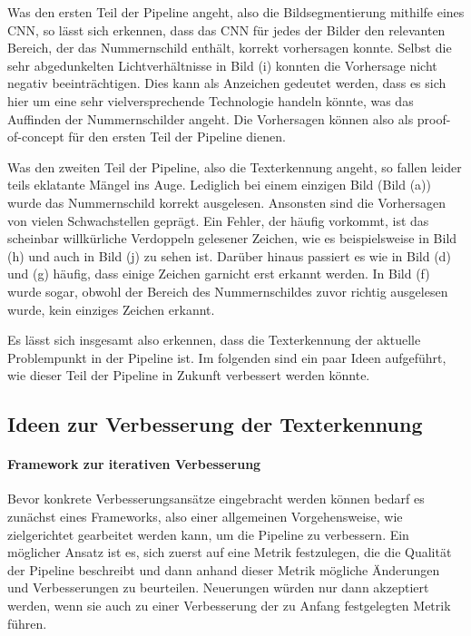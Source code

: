 Was den ersten Teil der Pipeline angeht, also die Bildsegmentierung
mithilfe eines CNN, so l\"asst sich erkennen, dass das CNN f\"ur jedes
der Bilder den relevanten Bereich, der das Nummernschild enth\"alt,
korrekt vorhersagen konnte.
Selbst die sehr abgedunkelten Lichtverh\"altnisse in Bild (i) konnten
die Vorhersage nicht negativ beeintr\"achtigen.
Dies kann als Anzeichen gedeutet werden, dass es sich hier um eine
sehr vielversprechende Technologie handeln k\"onnte, was das Auffinden
der Nummernschilder angeht.
Die Vorhersagen k\"onnen also als proof-of-concept f\"ur den ersten
Teil der Pipeline dienen.

Was den zweiten Teil der Pipeline, also die Texterkennung angeht, so
fallen leider teils eklatante M\"angel ins Auge.
Lediglich bei einem einzigen Bild (Bild (a)) wurde das Nummernschild
korrekt ausgelesen. Ansonsten sind die Vorhersagen von vielen
Schwachstellen gepr\"agt.
Ein Fehler, der h\"aufig vorkommt, ist das scheinbar
willk\"urliche Verdoppeln gelesener Zeichen, wie es beispielsweise
in Bild (h) und auch in Bild (j) zu sehen ist.
Dar\"uber hinaus passiert es wie in Bild (d) und (g) h\"aufig, dass
einige Zeichen garnicht erst erkannt werden.
In Bild (f) wurde sogar, obwohl der Bereich des Nummernschildes zuvor
richtig ausgelesen wurde, kein einziges Zeichen erkannt.

Es l\"asst sich insgesamt also erkennen, dass die Texterkennung
der aktuelle Problempunkt in der Pipeline ist.
Im folgenden sind ein paar Ideen aufgef\"uhrt, wie dieser Teil
der Pipeline in Zukunft verbessert werden k\"onnte.

\subsection{Ideen zur Verbesserung der Texterkennung}

\paragraph{Framework zur iterativen Verbesserung}

Bevor konkrete Verbesserungsans\"atze eingebracht werden k\"onnen bedarf
es zun\"achst eines Frameworks, also einer allgemeinen Vorgehensweise,
wie zielgerichtet gearbeitet werden kann, um die Pipeline zu verbessern.
Ein m\"oglicher Ansatz ist es, sich zuerst auf eine Metrik festzulegen,
die die Qualit\"at
der Pipeline beschreibt und dann anhand dieser Metrik m\"ogliche
\"Anderungen und Verbesserungen zu beurteilen.
Neuerungen w\"urden nur dann akzeptiert werden, wenn sie auch zu einer
Verbesserung der zu Anfang festgelegten Metrik f\"uhren.

